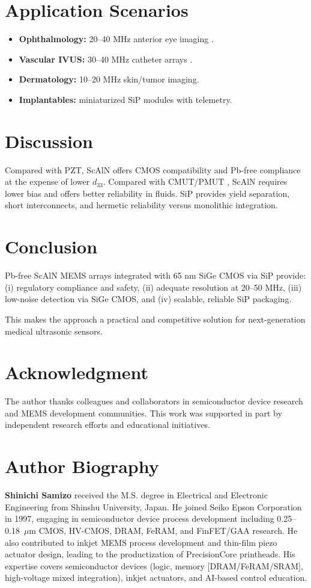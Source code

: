 \documentclass[conference]{IEEEtran}
\begin{document}
\section{Application Scenarios}
\begin{itemize}
  \item \textbf{Ophthalmology:} 20--40 MHz anterior eye imaging \cite{pavlin2009ubm}.
  \item \textbf{Vascular IVUS:} 30--40 MHz catheter arrays \cite{foster2000ivus}.
  \item \textbf{Dermatology:} 10--20 MHz skin/tumor imaging.
  \item \textbf{Implantables:} miniaturized SiP modules with telemetry.
\end{itemize}

\section{Discussion}
Compared with PZT, ScAlN offers CMOS compatibility and Pb-free compliance at the expense of lower $d_{33}$.  
Compared with CMUT/PMUT \cite{khuri2009cmut}, ScAlN requires lower bias and offers better reliability in fluids.  
SiP provides yield separation, short interconnects, and hermetic reliability versus monolithic integration.

\section{Conclusion}
Pb-free ScAlN MEMS arrays integrated with 65 nm SiGe CMOS via SiP provide:  
(i) regulatory compliance and safety,  
(ii) adequate resolution at 20--50 MHz,  
(iii) low-noise detection via SiGe CMOS, and  
(iv) scalable, reliable SiP packaging.  

This makes the approach a practical and competitive solution for next-generation medical ultrasonic sensors.

\section*{Acknowledgment}
The author thanks colleagues and collaborators in semiconductor device research and MEMS development communities. 
This work was supported in part by independent research efforts and educational initiatives.



\section*{Author Biography}
\textbf{Shinichi Samizo} received the M.S. degree in Electrical and Electronic Engineering
from Shinshu University, Japan. He joined Seiko Epson Corporation in 1997,
engaging in semiconductor device process development including 0.25--0.18~$\mu$m
CMOS, HV-CMOS, DRAM, FeRAM, and FinFET/GAA research. He also contributed to
inkjet MEMS process development and thin-film piezo actuator design, leading to
the productization of PrecisionCore printheads. His expertise covers
semiconductor devices (logic, memory [DRAM/FeRAM/SRAM], high-voltage mixed
integration), inkjet actuators, and AI-based control education.
\end{document}
